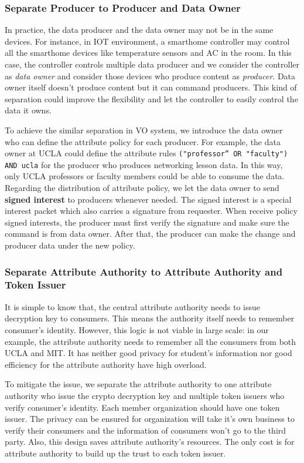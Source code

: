 \subsubsection{Separate Producer to Producer and Data Owner}
In practice, the data producer and the data owner may not be in the same devices.
For instance, in IOT environment, a smarthome controller may control all the smarthome devices like temperature sensors and AC in the room.
In this case, the controller controls multiple data producer and we consider the controller as \textit{data owner} and consider those devices who produce content as \textit{producer}.
Data owner itself doesn't produce content but it can command producers.
This kind of separation could improve the flexibility and let the controller to easily control the data it owns.

To achieve the similar separation in VO system, we introduce the data owner who can define the attribute policy for each producer.
For example, the data owner at UCLA could define the attribute rules \texttt{("professor'' OR "faculty") AND ucla} for the producer who produces networking lesson data.
In this way, only UCLA professors or faculty members could be able to consume the data.
Regarding the distribution of attribute policy, we let the data owner to send \textbf{signed interest} to producers whenever needed.
The signed interest is a special interest packet which also carries a signature from requester.
When receive policy signed interests, the producer must first verify the signature and make sure the command is from data owner.
After that, the producer can make the change and producer data under the new policy.

\subsubsection{Separate Attribute Authority to Attribute Authority and Token Issuer}
It is simple to know that, the central attribute authority needs to issue decryption key to consumers.
This means the authority itself needs to remember consumer's identity.
However, this logic is not viable in large scale: in our example, the attribute authority needs to remember all the consumers from both UCLA and MIT.
It has neither good privacy for student's information nor good efficiency for the attribute authority have high overload.

To mitigate the issue, we separate the attribute authority to one attribute authority who issue the crypto decryption key and multiple token issuers who verify consumer's identity.
Each member organization should have one token issuer.
The privacy can be ensured for organization will take it's own business to verify their consumers and the information of consumers won't go to the third party.
Also, this design saves attribute authority's resources.
The only cost is for attribute authority to build up the trust to each token issuer.

